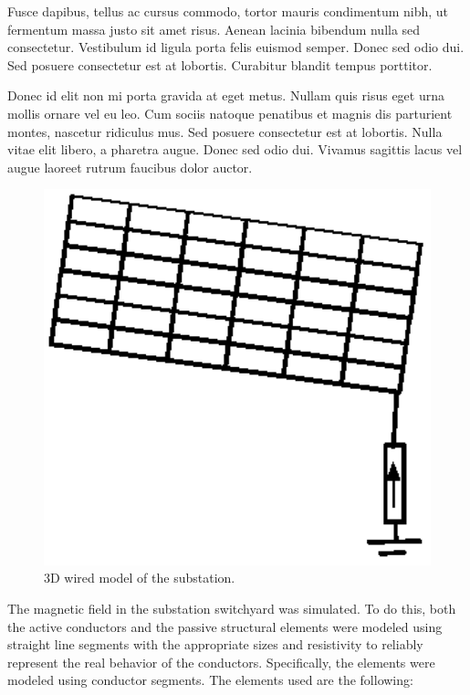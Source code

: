 \documentclass[journal]{../template/IEEEtran}
\begin{document}
Fusce dapibus, tellus ac cursus commodo, tortor mauris condimentum nibh, ut fermentum massa justo sit amet risus. Aenean lacinia bibendum nulla sed consectetur. Vestibulum id ligula porta felis euismod semper. Donec sed odio dui. Sed posuere consectetur est at lobortis. Curabitur blandit tempus porttitor.

Donec id elit non mi porta gravida at eget metus. Nullam quis risus eget urna mollis ornare vel eu leo. Cum sociis natoque penatibus et magnis dis parturient montes, nascetur ridiculus mus. Sed posuere consectetur est at lobortis. Nulla vitae elit libero, a pharetra augue. Donec sed odio dui. Vivamus sagittis lacus vel augue laoreet rutrum faucibus dolor auctor.

\begin{figure}[h]
	\centering
		\includegraphics[width=6.1in]{../resources/image.eps}
	\caption{3D wired model of the substation.}
	\label{fig:substationwire}
\end{figure}

The magnetic field in the substation switchyard was simulated. To do this, both the active conductors and the passive structural elements were modeled using straight line segments with the appropriate sizes and resistivity to reliably represent the real behavior of the conductors.  Specifically, the elements were modeled using conductor segments. The elements used are the following:
\end{document}
